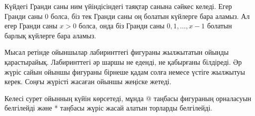 Күйдегі Гранди саны ним үйіндісіндегі таяқтар санына
сәйкес келеді. Егер Гранди саны 0 болса, біз тек
Гранди саны оң болатын күйлерге бара аламыз. Ал егер 
Гранди саны $x>0$ болса, онда біз 
Гранди саны $0,1,\ldots,x-1$ болатын барлық
күйлерге бара аламыз. 


Мысал ретінде ойыншылар лабиринттегі фигураны 
жылжытатын ойынды қарастырайық. Лабиринттегі 
әр шаршы не еденді, не қабырғаны білдіреді. 
Әр жүріс сайын ойыншы фигураны бірнеше қадам солға немесе үстіге 
жылжытуы керек. Соңғы жүрісті жасаған ойыншы жеңіске жетеді. 


Келесі сурет ойынның күйін көрсетеді, мұнда @
таңбасы фигураның орналасуын белгілейді және * таңбасы
жүріс жасай алатын торларды белгілейді. 


\begin{center}
\end{center}

